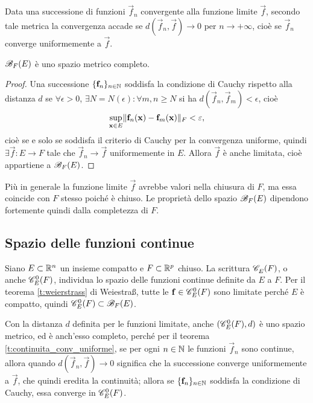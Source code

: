 Data una successione di funzioni $\vec f_n$ convergente alla funzione limite $\vec f$, secondo tale metrica la convergenza accade se $d(\vec f_n,\vec f)\to 0$ per $n\to+\infty$, cioè se $\vec f_n$ converge uniformemente a $\vec f$.
\begin{teorema}
$\bounded[F]{E}$ è uno spazio metrico completo.
\end{teorema}
\begin{proof}
Una successione $\{\vec f_n\}_{n\in\N}$ soddisfa la condizione di Cauchy rispetto alla distanza $d$ se $\forall\epsilon>0$, $\exists N=N(\epsilon)\colon\forall m,n\geq N$ si ha $d(\vec f_n,\vec f_m)<\epsilon$, cioè
\[
\sup_{\vec x\in E}\norm{\vec f_n(\vec x)-\vec f_m(\vec x)}_F<\epsilon,
\]
cioè se e solo se soddisfa il criterio di Cauchy per la convergenza uniforme, quindi $\exists\vec f\colon E\to F$ tale che $\vec f_n\to \vec f$ uniformemente in $E$. Allora $\vec f$ è anche limitata, cioè appartiene a $\bounded[F]{E}$.
\end{proof}
Più in generale la funzione limite $\vec f$ avrebbe valori nella chiusura di $F$, ma essa coincide con $F$ stesso poiché è chiuso. Le proprietà dello spazio $\bounded[F]{E}$ dipendono fortemente quindi dalla completezza di $F$.

\subsection*{Spazio delle funzioni continue}
\renewcommand{\cont}[2][]{\mathscr C^{#1}_{#2}\parentheses} %
%
Siano $E\subset\R^n$ un insieme compatto e $F\subset\R^p$ chiuso. La scrittura $\cont{E}{F}$, o anche $\cont[0]{E}{F}$, individua lo spazio delle funzioni continue definite da $E$ a $F$.
Per il teorema \ref{t:weierstrass} di Weiestra\ss, tutte le $\vec f\in\cont[0]{E}{F}$ sono limitate perché $E$ è compatto, quindi $\cont[0]{E}{F}\subset\bounded[F]{E}$.

Con la distanza $d$ definita per le funzioni limitate, anche $(\cont[0]{E}{F},d)$ è uno spazio metrico, ed è anch'esso completo, perché per il teorema \ref{t:continuita_conv_uniforme}, se per ogni $n\in\N$ le funzioni $\vec f_n$ sono continue, allora quando $d(\vec f_n,\vec f)\to 0$ significa che la successione converge uniformemente a $\vec f$, che quindi eredita la continuità; allora se $\{\vec f_n\}_{n\in\N}$ soddisfa la condizione di Cauchy, essa converge in $\cont[0]{E}{F}$.
%
\renewcommand{\cont}[1][]{\mathscr C^{#1}\parentheses} %

